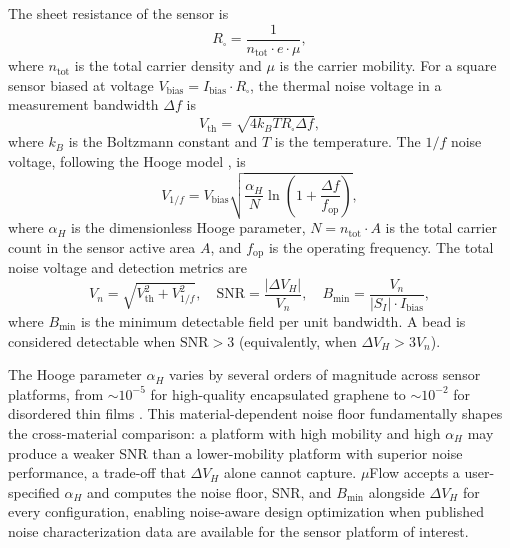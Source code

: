 \documentclass[preprint,review,12pt]{elsarticle}
\begin{document}
The sheet resistance of the sensor is
\begin{equation}
R_\square = \frac{1}{n_\text{tot} \cdot e \cdot \mu},
\label{eq:rsq}
\end{equation}
where $n_\text{tot}$ is the total carrier density and $\mu$ is the carrier mobility. For a square sensor biased at voltage $V_\text{bias} = I_\text{bias} \cdot R_\square$, the thermal noise voltage in a measurement bandwidth $\Delta f$ is
\begin{equation}
V_\text{th} = \sqrt{4 k_B T R_\square \Delta f},
\label{eq:thermal}
\end{equation}
where $k_B$ is the Boltzmann constant and $T$ is the temperature. The $1/f$ noise voltage, following the Hooge model \cite{xu2013,huang2014}, is
\begin{equation}
V_{1/f} = V_\text{bias}\sqrt{\frac{\alpha_H}{N} \ln\!\left(1 + \frac{\Delta f}{f_\text{op}}\right)},
\label{eq:flicker}
\end{equation}
where $\alpha_H$ is the dimensionless Hooge parameter, $N = n_\text{tot} \cdot A$ is the total carrier count in the sensor active area $A$, and $f_\text{op}$ is the operating frequency. The total noise voltage and detection metrics are
\begin{equation}
V_n = \sqrt{V_\text{th}^2 + V_{1/f}^2}, \quad \text{SNR} = \frac{|\Delta V_H|}{V_n}, \quad B_\text{min} = \frac{V_n}{|S_I| \cdot I_\text{bias}},
\label{eq:snr}
\end{equation}
where $B_\text{min}$ is the minimum detectable field per unit bandwidth. A bead is considered detectable when $\text{SNR} > 3$ (equivalently, when $\Delta V_H > 3 V_n$).

The Hooge parameter $\alpha_H$ varies by several orders of magnitude across sensor platforms, from ${\sim}10^{-5}$ for high-quality encapsulated graphene to ${\sim}10^{-2}$ for disordered thin films \cite{xu2013,huang2014}. This material-dependent noise floor fundamentally shapes the cross-material comparison: a platform with high mobility and high $\alpha_H$ may produce a weaker SNR than a lower-mobility platform with superior noise performance, a trade-off that $\Delta V_H$ alone cannot capture. $\mu$Flow accepts a user-specified $\alpha_H$ and computes the noise floor, SNR, and $B_\text{min}$ alongside $\Delta V_H$ for every configuration, enabling noise-aware design optimization when published noise characterization data are available for the sensor platform of interest.

\end{document}
